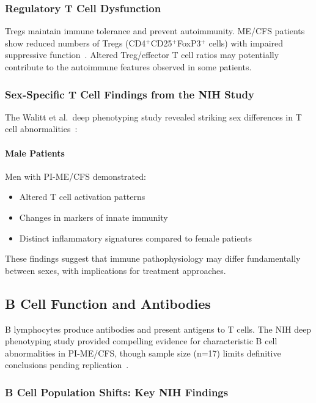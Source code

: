 \subsubsection{Regulatory T Cell Dysfunction}

Tregs maintain immune tolerance and prevent autoimmunity. ME/CFS patients show reduced numbers of Tregs (CD4$^{+}$CD25$^{+}$FoxP3$^{+}$ cells) with impaired suppressive function~\cite{Brenu2012miRNA,EatonFitch2019}. Altered Treg/effector T cell ratios may potentially contribute to the autoimmune features observed in some patients.

\subsubsection{Sex-Specific T Cell Findings from the NIH Study}

The Walitt et al.\ deep phenotyping study revealed striking sex differences in T cell abnormalities~\cite{walitt2024deep}:

\paragraph{Male Patients}
Men with PI-ME/CFS demonstrated:
\begin{itemize}
    \item Altered T cell activation patterns
    \item Changes in markers of innate immunity
    \item Distinct inflammatory signatures compared to female patients
\end{itemize}

These findings suggest that immune pathophysiology may differ fundamentally between sexes, with implications for treatment approaches.

\subsection{B Cell Function and Antibodies}
\label{sec:b-cells}

B lymphocytes produce antibodies and present antigens to T cells. The NIH deep phenotyping study provided compelling evidence for characteristic B cell abnormalities in PI-ME/CFS, though sample size (n=17) limits definitive conclusions pending replication~\cite{walitt2024deep}.

\subsubsection{B Cell Population Shifts: Key NIH Findings}

